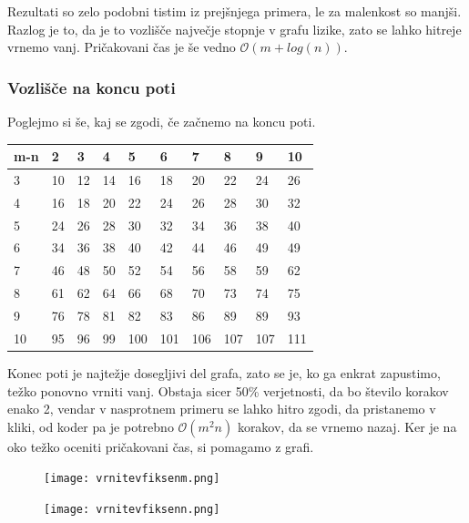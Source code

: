\documentclass[12pt,a4paper]{amsart}
\begin{document}
Rezultati so zelo podobni tistim iz prejšnjega primera, le za malenkost so manjši. Razlog je to, da je to vozlišče
največje stopnje v grafu lizike, zato se lahko hitreje vrnemo vanj.
Pričakovani čas je še vedno $\mathcal{O}(m+log(n))$.

\subsubsection{Vozlišče na koncu poti}

Poglejmo si še, kaj se zgodi, če začnemo na koncu poti.

\begin{table}[!ht]
    \centering
    \begin{tabular}{|l|l|l|l|l|l|l|l|l|l|}
    \hline
        m-n & 2 & 3 & 4 & 5 & 6 & 7 & 8 & 9 & 10 \\ \hline
        3 & 10 & 12 & 14 & 16 & 18 & 20 & 22 & 24 & 26 \\ \hline
        4 & 16 & 18 & 20 & 22 & 24 & 26 & 28 & 30 & 32 \\ \hline
        5 & 24 & 26 & 28 & 30 & 32 & 34 & 36 & 38 & 40 \\ \hline
        6 & 34 & 36 & 38 & 40 & 42 & 44 & 46 & 49 & 49 \\ \hline
        7 & 46 & 48 & 50 & 52 & 54 & 56 & 58 & 59 & 62 \\ \hline
        8 & 61 & 62 & 64 & 66 & 68 & 70 & 73 & 74 & 75 \\ \hline
        9 & 76 & 78 & 81 & 82 & 83 & 86 & 89 & 89 & 93 \\ \hline
        10 & 95 & 96 & 99 & 100 & 101 & 106 & 107 & 107 & 111 \\ \hline
    \end{tabular}
\end{table}

Konec poti je najtežje dosegljivi del grafa, zato se je, ko ga enkrat zapustimo, težko ponovno vrniti vanj. Obstaja
sicer 50\% verjetnosti, da bo število korakov enako 2, vendar v nasprotnem primeru se lahko hitro zgodi, da pristanemo
v kliki, od koder pa je potrebno $\mathcal{O}(m^2n)$ korakov, da se vrnemo nazaj.
Ker je na oko težko oceniti pričakovani čas, si pomagamo z grafi.

\begin{figure}[h]
    \texttt{[image: vrnitevfiksenm.png]}
\end{figure}

\begin{figure}[h]
    \texttt{[image: vrnitevfiksenn.png]}
\end{figure}
\end{document}
